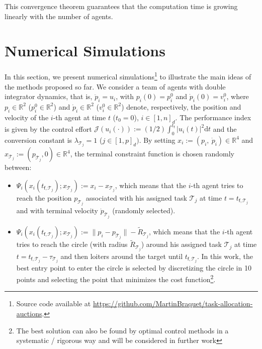 \documentclass{ifacconf}
\newcommand{\f}{{\mathsf{f}}}
\newcommand{\cJ}{\mathcal{J}}
\newcommand{\cT}{\mathcal{T}}
\begin{document}
\begin{remark}
This convergence theorem guarantees that the computation time is growing linearly with the number of agents.
\end{remark}

\section{Numerical Simulations}\label{s:simu}

In this section, we present numerical simulations\footnote{Source code available at \url{https://github.com/MartinBraquet/task-allocation-auctions}.} to illustrate the main ideas of the methods proposed so far. We consider a team of agents with double integrator dynamics, that is, $\ddot{p}_i = u_i$, 
with $p_i(0)=p_i^0$ and $\dot{p}_i(0)=v_i^0$, where $p_i \in \mathbb{R}^2$ ($p_i^0 \in \mathbb{R}^2$) and $\dot{p}_i \in \mathbb{R}^2$ ($v_i^0 \in \mathbb{R}^2$) denote, respectively, the position and velocity of the $i$-th agent at time $t$ ($t_0=0$), $i \in [1,n]_d$. The performance index is given by the control effort $
\cJ(u_i(\cdot)) := (1/2) \int_{0}^{t_\f} |u_i(t)|^2 \mathrm{d}t$ and the conversion constant is $\lambda_{\cT_j} = 1$ ($j \in [1,p]_d)$. By setting $x_i := (p_i,~\dot{p}_i) \in \mathbb{R}^4$ and $x_{\cT_j} := (p_{\cT_j}, 0) \in \mathbb{R}^4$, the terminal constraint function is chosen randomly between:
\begin{itemize}
    \item $\Psi_i(x_i(t_{\f,\cT_j}); x_{\cT_j}) := x_i - x_{\cT_j}$,  which means that the $i$-th agent tries to reach the position $p_{\cT_j}$ associated with his assigned task $\cT_j$ at time $t=t_{\f,\cT_j}$ and with terminal velocity $\dot{p}_{\cT_j}$ (randomly selected). %
    \item $\Psi_i(x_i(t_{\f,\cT_j}); x_{\cT_j}) := \|p_i - p_{\cT_j}\| - \tilde{R}_{\cT_j}$,  which means that the $i$-th agent tries to reach the circle (with radius $\tilde{R}_{\cT_j}$) around his assigned task $\cT_j$ at time $t=t_{\f,\cT_j}-\tau_{\cT_j}$ and then loiters around the target until $t_{\f,\cT_j}$. In this work, the best entry point to enter the circle is selected by discretizing the circle in 10 points and selecting the point that minimizes the cost function\footnote{The best solution can also be found by optimal control methods in a systematic / rigorous way and will be considered in further work}. 
\end{itemize}
\end{document}
